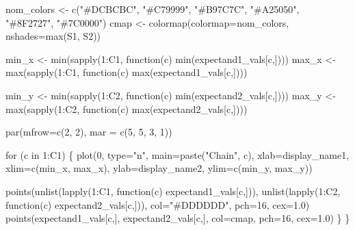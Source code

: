 \documentclass[
  letterpaper,
  DIV=11,
  numbers=noendperiod]{scrartcl}
\newenvironment{Shaded}{\begin{snugshade}}{\end{snugshade}}
\newcommand{\BuiltInTok}[1]{\textcolor[rgb]{0.00,0.23,0.31}{#1}}
\newcommand{\ControlFlowTok}[1]{\textcolor[rgb]{0.00,0.23,0.31}{#1}}
\newcommand{\DecValTok}[1]{\textcolor[rgb]{0.68,0.00,0.00}{#1}}
\newcommand{\FloatTok}[1]{\textcolor[rgb]{0.68,0.00,0.00}{#1}}
\newcommand{\KeywordTok}[1]{\textcolor[rgb]{0.00,0.23,0.31}{#1}}
\newcommand{\NormalTok}[1]{\textcolor[rgb]{0.00,0.23,0.31}{#1}}
\newcommand{\OperatorTok}[1]{\textcolor[rgb]{0.37,0.37,0.37}{#1}}
\newcommand{\StringTok}[1]{\textcolor[rgb]{0.13,0.47,0.30}{#1}}
\begin{document}
\begin{Shaded}
\begin{Highlighting}[]
\NormalTok{  nom\_colors }\OperatorTok{\textless{}{-}}\NormalTok{ c(}\StringTok{"\#DCBCBC"}\NormalTok{, }\StringTok{"\#C79999"}\NormalTok{, }\StringTok{"\#B97C7C"}\NormalTok{,}
                  \StringTok{"\#A25050"}\NormalTok{, }\StringTok{"\#8F2727"}\NormalTok{, }\StringTok{"\#7C0000"}\NormalTok{)}
\NormalTok{  cmap }\OperatorTok{\textless{}{-}}\NormalTok{ colormap(colormap}\OperatorTok{=}\NormalTok{nom\_colors, nshades}\OperatorTok{=}\BuiltInTok{max}\NormalTok{(S1, S2))}

\NormalTok{  min\_x }\OperatorTok{\textless{}{-}} \BuiltInTok{min}\NormalTok{(sapply(}\DecValTok{1}\NormalTok{:C1, function(c) }\BuiltInTok{min}\NormalTok{(expectand1\_vals[c,])))}
\NormalTok{  max\_x }\OperatorTok{\textless{}{-}} \BuiltInTok{max}\NormalTok{(sapply(}\DecValTok{1}\NormalTok{:C1, function(c) }\BuiltInTok{max}\NormalTok{(expectand1\_vals[c,])))}

\NormalTok{  min\_y }\OperatorTok{\textless{}{-}} \BuiltInTok{min}\NormalTok{(sapply(}\DecValTok{1}\NormalTok{:C2, function(c) }\BuiltInTok{min}\NormalTok{(expectand2\_vals[c,])))}
\NormalTok{  max\_y }\OperatorTok{\textless{}{-}} \BuiltInTok{max}\NormalTok{(sapply(}\DecValTok{1}\NormalTok{:C2, function(c) }\BuiltInTok{max}\NormalTok{(expectand2\_vals[c,])))}

\NormalTok{  par(mfrow}\OperatorTok{=}\NormalTok{c(}\DecValTok{2}\NormalTok{, }\DecValTok{2}\NormalTok{), mar }\OperatorTok{=}\NormalTok{ c(}\DecValTok{5}\NormalTok{, }\DecValTok{5}\NormalTok{, }\DecValTok{3}\NormalTok{, }\DecValTok{1}\NormalTok{))}

  \ControlFlowTok{for}\NormalTok{ (c }\KeywordTok{in} \DecValTok{1}\NormalTok{:C1) \{}
\NormalTok{    plot(}\DecValTok{0}\NormalTok{, }\BuiltInTok{type}\OperatorTok{=}\StringTok{"n"}\NormalTok{, main}\OperatorTok{=}\NormalTok{paste(}\StringTok{"Chain"}\NormalTok{, c),}
\NormalTok{         xlab}\OperatorTok{=}\NormalTok{display\_name1, xlim}\OperatorTok{=}\NormalTok{c(min\_x, max\_x),}
\NormalTok{         ylab}\OperatorTok{=}\NormalTok{display\_name2, ylim}\OperatorTok{=}\NormalTok{c(min\_y, max\_y))}
  
\NormalTok{    points(unlist(lapply(}\DecValTok{1}\NormalTok{:C1, function(c) expectand1\_vals[c,])),}
\NormalTok{           unlist(lapply(}\DecValTok{1}\NormalTok{:C2, function(c) expectand2\_vals[c,])),}
\NormalTok{           col}\OperatorTok{=}\StringTok{"\#DDDDDD"}\NormalTok{, pch}\OperatorTok{=}\DecValTok{16}\NormalTok{, cex}\OperatorTok{=}\FloatTok{1.0}\NormalTok{)}
\NormalTok{    points(expectand1\_vals[c,], expectand2\_vals[c,],}
\NormalTok{           col}\OperatorTok{=}\NormalTok{cmap, pch}\OperatorTok{=}\DecValTok{16}\NormalTok{, cex}\OperatorTok{=}\FloatTok{1.0}\NormalTok{)}
\NormalTok{  \}}
\NormalTok{\}}
\end{Highlighting}
\end{Shaded}
\end{document}
